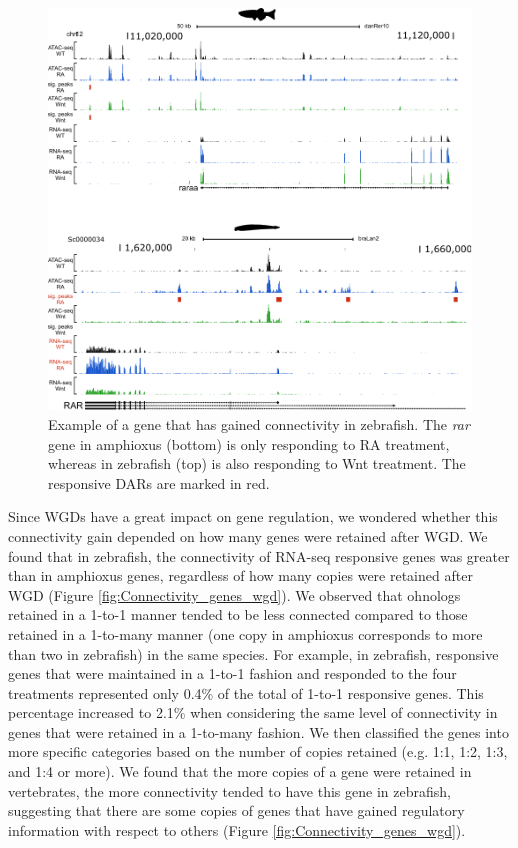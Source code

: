 \begin{figure}[hp]
\centering
\includegraphics[width=1\textwidth]{Figures/DSG_connec_example}
\caption[Example of connected DSG]{Example of a gene that has gained connectivity in zebrafish. The \textit{rar} gene in amphioxus (bottom) is only responding to RA treatment, whereas in zebrafish (top) is also responding to Wnt treatment. The responsive DARs are marked in red.}
\label{fig:DSG_connec_example}
\end{figure} 




Since WGDs have a great impact on gene regulation, we wondered whether this connectivity gain depended on how many genes were retained after WGD. We found that in zebrafish, the connectivity of RNA-seq responsive genes was greater than in amphioxus genes, regardless of how many copies were retained after WGD (Figure \ref{fig:Connectivity_genes_wgd}). We observed that ohnologs retained in a 1-to-1 manner tended to be less connected compared to those retained in a 1-to-many manner (one copy in amphioxus corresponds to more than two in zebrafish) in the same species. For example, in zebrafish, responsive genes that were maintained in a 1-to-1 fashion and responded to the four treatments represented only 0.4\% of the total of 1-to-1 responsive genes. This percentage increased to 2.1\% when considering the same level of connectivity in genes that were retained in a 1-to-many fashion. We then classified the genes into more specific categories based on the number of copies retained (e.g. 1:1, 1:2, 1:3, and 1:4 or more). We found that the more copies of a gene were retained in vertebrates, the more connectivity tended to have this gene in zebrafish, suggesting that there are some copies of genes that have gained regulatory information with respect to others (Figure \ref{fig:Connectivity_genes_wgd}). 


